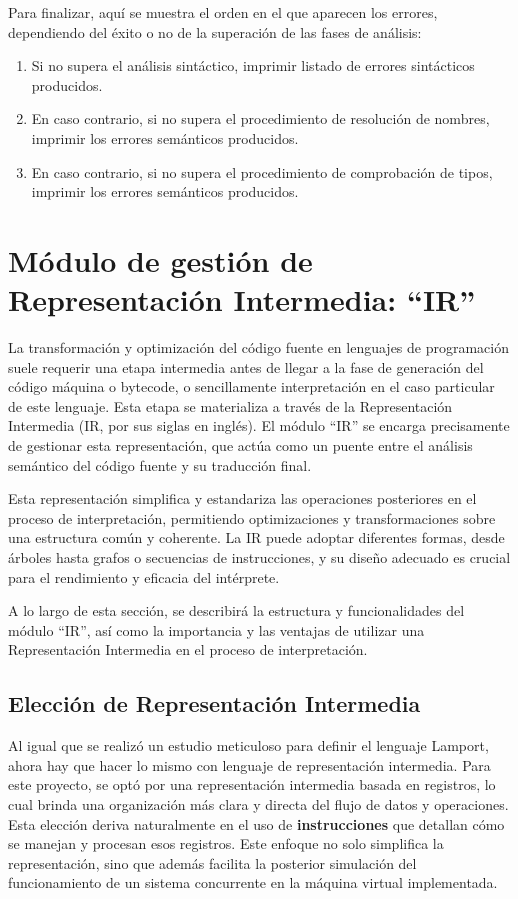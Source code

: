 Para finalizar, aquí se muestra el orden en el que aparecen los errores, dependiendo del éxito o no de la superación de las fases de análisis:

\begin{enumerate}
    \item Si no supera el análisis sintáctico, imprimir listado de errores sintácticos producidos.
    \item En caso contrario, si no supera el procedimiento de resolución de nombres, imprimir los errores semánticos producidos.
    \item En caso contrario, si no supera el procedimiento de comprobación de tipos, imprimir los errores semánticos producidos.
\end{enumerate}

\section{Módulo de gestión de Representación Intermedia: ``IR''}\label{sec:implementacionIR}
La transformación y optimización del código fuente en lenguajes de programación suele requerir una etapa intermedia antes de llegar a la fase de generación del código máquina o bytecode, o sencillamente interpretación en el caso particular de este lenguaje. Esta etapa se materializa a través de la Representación Intermedia (IR, por sus siglas en inglés). El módulo ``IR'' se encarga precisamente de gestionar esta representación, que actúa como un puente entre el análisis semántico del código fuente y su traducción final.


Esta representación simplifica y estandariza las operaciones posteriores en el proceso de interpretación, permitiendo optimizaciones y transformaciones sobre una estructura común y coherente. La IR puede adoptar diferentes formas, desde árboles hasta grafos o secuencias de instrucciones, y su diseño adecuado es crucial para el rendimiento y eficacia del intérprete.


A lo largo de esta sección, se describirá la estructura y funcionalidades del módulo ``IR'', así como la importancia y las ventajas de utilizar una Representación Intermedia en el proceso de interpretación.

\subsection{Elección de Representación Intermedia}
Al igual que se realizó un estudio meticuloso para definir el lenguaje Lamport, ahora hay que hacer lo mismo con lenguaje de representación intermedia. Para este proyecto, se optó por una representación intermedia basada en registros, lo cual brinda una organización más clara y directa del flujo de datos y operaciones. Esta elección deriva naturalmente en el uso de \textbf{instrucciones} que detallan cómo se manejan y procesan esos registros. Este enfoque no solo simplifica la representación, sino que además facilita la posterior simulación del funcionamiento de un sistema concurrente en la máquina virtual implementada.


